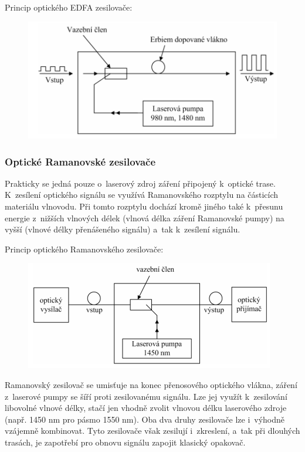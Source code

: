 Princip optického EDFA zesilovače:
\begin{figure}[!ht]
  \begin{center}
    \includegraphics[scale=1]{obrazky/EDFA.png}
  \end{center}
\end{figure}


\subsubsection{Optické Ramanovské zesilovače}
Prakticky se jedná pouze o~laserový zdroj záření připojený k~optické trase. K~zesílení optického signálu se využívá Ramanovského rozptylu na částicích materiálu vlnovodu. Při tomto rozptylu dochází kromě jiného také k~přesunu energie z~nižších vlnových délek (vlnová délka záření Ramanovské pumpy) na vyšší (vlnové délky přenášeného signálu) a~tak k~zesílení signálu.

Princip optického Ramanovského zesilovače:
\begin{figure}[!ht]
  \begin{center}
    \includegraphics[scale=1]{obrazky/Raman.png}
  \end{center}
\end{figure}


Ramanovský zesilovač se umisťuje na konec přenosového optického vlákna, záření z~laserové pumpy se šíří proti zesilovanému signálu. Lze jej využít k~zesilování libovolné vlnové délky, stačí jen vhodně zvolit vlnovou délku laserového zdroje (např. 1450 nm pro pásmo 1550 nm). Oba dva druhy zesilovače lze i~výhodně vzájemně kombinovat. Tyto zesilovače však zesilují i~zkreslení, a~tak při dlouhých trasách, je zapotřebí pro obnovu signálu zapojit klasický opakovač.

